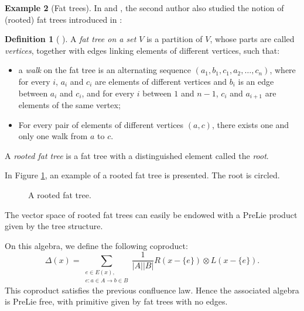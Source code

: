 \documentclass[11pt,leqno]{amsart}
\theoremstyle{definition}
\newtheorem{definition}{Definition}[subsection]
\newtheorem{example}[definition]{Example}
\theoremstyle{plain}
\begin{document}
\begin{example}[Fat trees] \label{Fat trees}
In \cite{mar2} and \cite{PhD}, the second author also studied the notion of (rooted) fat trees introduced in \cite{Zas}:

\begin{definition}[ \cite{Zas}] 
A \emph{fat tree on a set $V$} is a partition of $V$, whose parts are called \emph{vertices}, together with edges linking elements of different vertices, such that: 
\begin{itemize}
\item a \emph{walk} on the fat tree is an alternating sequence $\left(a_1, b_1, c_1, a_2, \ldots, c_n\right)$, where for every $i$, $a_i$ and $c_i$ are elements of different vertices and $b_i$ is an edge between $a_i$ and $c_i$, and for every $i$ between $1$ and $n-1$, $c_i$ and $a_{i+1}$ are elements of the same vertex;
\item For every pair of elements of different vertices $\left(a,c\right)$, there exists one and only one walk from $a$ to $c$.
\end{itemize}
 

A \emph{rooted fat tree} is a fat tree with a distinguished element called the \emph{root}.
\end{definition}

In Figure \ref{exemple fat}, an example of a rooted fat tree is presented. The root is circled.

\begin{figure} 
\centering
{}
\caption{ \label{exemple fat} A rooted fat tree.}
\end{figure}

The vector space of rooted fat trees can easily be endowed with a PreLie product given by the tree structure.

 On this algebra, we define the following coproduct:
\begin{equation*}
\Delta(x)=\sum_{\substack{e \in E(x),\\ e: a\in A \rightarrow b \in B}} \frac{1}{|A||B|} R(x-\{e\}) \otimes L(x-\{e\}).
\end{equation*}
This coproduct satisfies the previous confluence law. Hence the associated algebra is PreLie free, with primitive given by fat trees with no edges.

\end{example}
\end{document}
